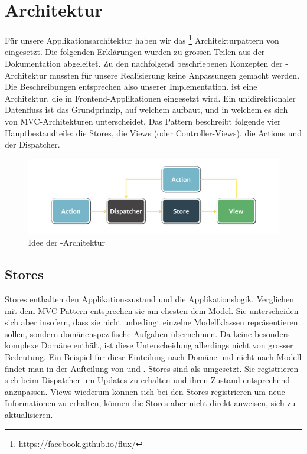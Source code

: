 \label{pd-architektur}
\section{Architektur}
Für unsere Applikationsarchitektur haben wir das \footnote{\url{https://facebook.github.io/flux/}} Architekturpattern von  eingesetzt.\newline
Die folgenden Erklärungen wurden zu grossen Teilen aus der  Dokumentation\cite{flux-docs-overview} abgeleitet.
Zu den nachfolgend beschriebenen Konzepten der -Architektur mussten für unsere Realisierung keine Anpassungen gemacht werden.
Die Beschreibungen entsprechen also unserer Implementation.\newline
{} ist eine Architektur, die in \gls{Frontend}-Applikationen eingesetzt wird.
Ein unidirektionaler Datenfluss ist das Grundprinzip, auf welchem  aufbaut, und in welchem es sich von \gls{MVC}-Architekturen unterscheidet.
Das Pattern beschreibt folgende vier Hauptbestandteile: die Stores, die Views (oder Controller-Views), die Actions und der Dispatcher.
\begin{figure}[H]
 	\centering
 	\includegraphics[width=\textwidth]{images/projektdokumentation/flux-uebersicht-weiss.png}
 	\caption{Idee der -Architektur}
 	\label{image-flux-overview-simple}
\end{figure}
\subsection{Stores}
\label{pd-flux-stores}
Stores enthalten den Applikationszustand und die Applikationslogik.
Verglichen mit dem \gls{MVC}-Pattern entsprechen sie am ehesten dem Model.
Sie unterscheiden sich aber insofern, dass sie nicht unbedingt einzelne Modellklassen repräsentieren sollen, sondern domänenspezifische Aufgaben übernehmen.
Da \kort{} keine besonders komplexe Domäne enthält, ist diese Unterscheidung allerdings nicht von grosser Bedeutung.
Ein Beispiel für diese Einteilung nach Domäne und nicht nach Modell findet man in der Aufteilung von  und .\newline
Stores sind als  umgesetzt.
Sie registrieren sich beim Dispatcher um Updates zu erhalten und ihren Zustand entsprechend anzupassen.
Views wiederum können sich bei den Stores registrieren um neue Informationen zu erhalten, können die Stores aber nicht direkt anweisen, sich zu aktualisieren.

